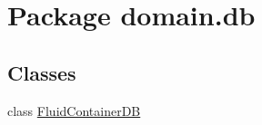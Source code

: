 \hypertarget{namespacedomain_1_1db}{}\section{Package domain.\+db}
\label{namespacedomain_1_1db}
\subsection*{Classes}
\begin{DoxyCompactItemize}
\item 
class \mbox{\hyperlink{classdomain_1_1db_1_1FluidContainerDB}{Fluid\+Container\+DB}}
\end{DoxyCompactItemize}
